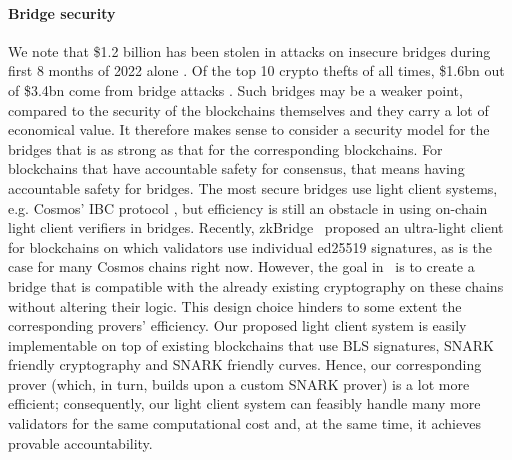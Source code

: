 \paragraph{Bridge security} We note that \$1.2 billion has been stolen in attacks on insecure bridges during first 8 months of 2022 alone \cite{elliptic_harmony,elliptic_nomad}. 
Of the top 10 crypto thefts of all times, \$1.6bn out of \$3.4bn come from bridge attacks \cite{elliptic_nomad}. Such bridges may be a weaker point, 
compared to the security of the blockchains themselves and they carry a lot of economical value. It therefore makes sense to consider a security model 
for the bridges that is as strong as that for the corresponding blockchains. For blockchains that have accountable safety for consensus, that means 
having accountable safety for bridges. The most secure bridges use light client systems, e.g. Cosmos' IBC protocol \cite{IBC_paper}, but efficiency is still an 
obstacle in using on-chain light client verifiers in bridges. Recently, zkBridge~\cite{zkBridge} proposed an ultra-light client for blockchains on which validators use 
individual ed25519 signatures, as is the case for many Cosmos chains right now. However, the goal in~\cite{zkBridge} is to create a bridge that is compatible with 
the already existing cryptography on these chains without altering their logic. This design choice hinders to some extent the corresponding provers' efficiency. 
Our proposed light client system is easily implementable on top of existing blockchains that use BLS signatures, SNARK friendly cryptography and SNARK 
friendly curves. Hence, our corresponding prover (which, in turn, builds upon a custom SNARK prover) is a lot more efficient; consequently, our light client system 
can feasibly handle many more validators for the same computational cost and, at the same time, it achieves provable accountability. 


